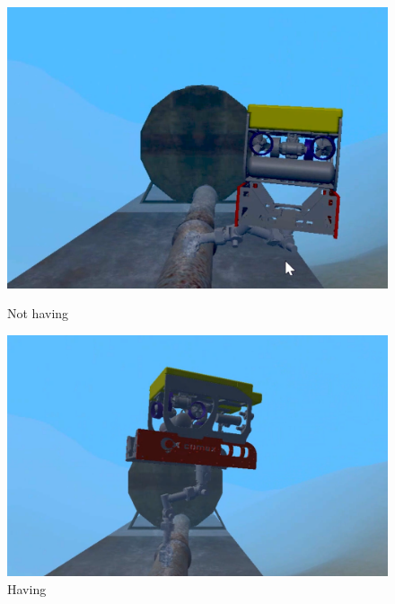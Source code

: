 \documentclass{article}
\begin{document}
\begin{figure}[htp]
    \centering
    \begin{minipage}{0.50\textwidth}
    \includegraphics[scale=0.37]{513_comment.png}
    \caption{Not having}
    \end{minipage}
\hfill
    \centering
    \begin{minipage}{0.50\textwidth}
    \includegraphics[scale=0.3]{513_uncomment.png}
    \caption{Having}
    \end{minipage}
\end{figure}
\end{document}
